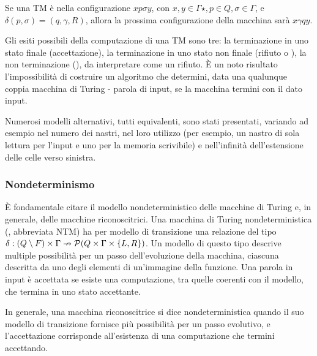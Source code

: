 \begin{examp}
	Se una TM è nella configurazione $xp\sigma y$, con $x,y\in\Gamma\star, p\in Q,\sigma\in\Gamma$, e $\delta(p,\sigma)=(q,\gamma,R)$, allora la prossima configurazione della macchina sarà $x\gamma qy$.
\end{examp}

Gli esiti possibili della computazione di una TM sono tre: la terminazione in uno stato finale (accettazione), la terminazione in uno stato non finale (rifiuto o ), la non terminazione (), da interpretare come un rifiuto. È un noto risultato l'impossibilità di costruire un algoritmo che determini, data una qualunque coppia macchina di Turing - parola di input, se la macchina termini con il dato input.

Numerosi modelli alternativi, tutti equivalenti, sono stati presentati, variando ad esempio nel numero dei nastri, nel loro utilizzo (per esempio, un nastro di sola lettura per l'input e uno per la memoria scrivibile) e nell'infinità dell'estensione delle celle verso sinistra.

\subsubsection{Nondeterminismo}
È fondamentale citare il modello nondeterministico delle macchine di Turing e, in generale, delle macchine riconoscitrici. Una macchina di Turing nondeterministica (, abbreviata NTM) ha per modello di transizione una relazione del tipo $\delta:(Q\setminus F)\times\Gamma\nrightarrow \mathcal P(Q\times\Gamma\times\left\{ L,R \right\})$. Un modello di questo tipo descrive multiple possibilità per un passo dell'evoluzione della macchina, ciascuna descritta da uno degli elementi di un'immagine della funzione. Una parola in input è accettata se esiste una computazione, tra quelle coerenti con il modello, che termina in uno stato accettante.

In generale, una macchina riconoscitrice si dice nondeterministica quando il suo modello di transizione fornisce più possibilità per un passo evolutivo, e l'accettazione corrisponde all'esistenza di una computazione che termini accettando.

